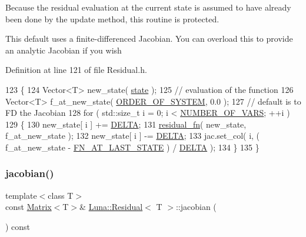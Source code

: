 Because the residual evaluation at the current state is assumed to have already been done by the \textquotesingle{}update\textquotesingle{} method, this routine is protected. 

This default uses a finite-\/differenced Jacobian. You can overload this to provide an analytic Jacobian if you wish 

Definition at line 121 of file Residual.\+h.


\begin{DoxyCode}
123   \{
124     Vector<T> new\_state( \hyperlink{classLuna_1_1Residual_a41d9f863aa529f16c5d78fb19b4906bd}{state} );
125     \textcolor{comment}{// evaluation of the function}
126     Vector<T> f\_at\_new\_state( \hyperlink{classLuna_1_1Residual_a7facf1267eb277d84aeea8beba2cb200}{ORDER\_OF\_SYSTEM}, 0.0 );
127     \textcolor{comment}{// default is to FD the Jacobian}
128     \textcolor{keywordflow}{for} ( std::size\_t i = 0; i < \hyperlink{classLuna_1_1Residual_a8e7a52a94a49d900ba2784e621a35668}{NUMBER\_OF\_VARS}; ++i )
129     \{
130       new\_state[ i ] += \hyperlink{classLuna_1_1Residual_a1bf38ddfa149797de560dcb11c975fef}{DELTA};
131       \hyperlink{classLuna_1_1Residual_ae1b1ebe3314c788b176bcac7b328de5c}{residual\_fn}( new\_state, f\_at\_new\_state );
132       new\_state[ i ] -= \hyperlink{classLuna_1_1Residual_a1bf38ddfa149797de560dcb11c975fef}{DELTA};
133       jac.set\_col( i, ( f\_at\_new\_state - \hyperlink{classLuna_1_1Residual_ac7b086911239d3f42ceec4a826e83543}{FN\_AT\_LAST\_STATE} ) / 
      \hyperlink{classLuna_1_1Residual_a1bf38ddfa149797de560dcb11c975fef}{DELTA} );
134     \}
135   \}
\end{DoxyCode}
\mbox{\label{classLuna_1_1Residual_adffbafa712fc6318f3cd05c03b88decb}} 
\subsubsection{\texorpdfstring{jacobian()}{jacobian()}\hspace{0.1cm}{\footnotesize\ttfamily [2/2]}}
{\footnotesize\ttfamily template$<$class T$>$ \\
const \hyperlink{classLuna_1_1Matrix}{Matrix}$<$T$>$\& \hyperlink{classLuna_1_1Residual}{Luna\+::\+Residual}$<$ T $>$\+::jacobian (\begin{DoxyParamCaption}{ }\end{DoxyParamCaption}) const\hspace{0.3cm}{\ttfamily [inline]}}



